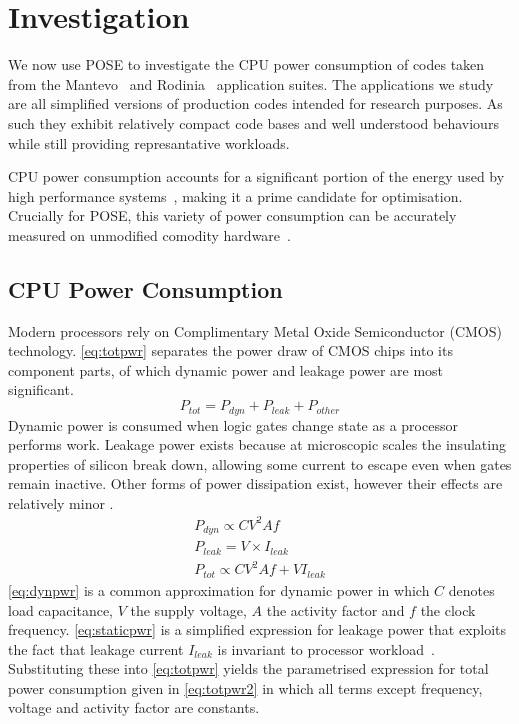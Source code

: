 \section{Investigation}
\label{sec:investigation}
We now use POSE to investigate the CPU power consumption of codes taken from the Mantevo~\cite{heroux:2009aa} and Rodinia~\cite{che:2009aa} application suites.
The applications we study are all simplified versions of production codes intended for research purposes.
As such they exhibit relatively compact code bases and well understood behaviours while still providing represantative workloads.

CPU power consumption accounts for a significant portion of the energy used by high performance systems~\cite{rong:2010aa}, making it a prime candidate for optimisation.
Crucially for POSE, this variety of power consumption can be accurately measured on unmodified comodity hardware~\cite{hackenberg:2013aa}.

\subsection{CPU Power Consumption}
\label{ssec:cpupower}
Modern processors rely on Complimentary Metal Oxide Semiconductor (CMOS) technology.
\autoref{eq:totpwr} separates the power draw of CMOS chips into its component parts, of which dynamic power and leakage power are most significant.
\begin{equation}
\label{eq:totpwr}
P_{tot} = P_{dyn} + P_{leak} + P_{other}
\end{equation}
Dynamic power is consumed when logic gates change state as a processor performs work. 
Leakage power exists because at microscopic scales the insulating properties of silicon break down, allowing some current to escape even when gates remain inactive.
Other forms of power dissipation exist, however their effects are relatively minor \cite{kaxiras:2008aa}.
\begin{gather}
P_{dyn} \propto CV^{2}Af \label{eq:dynpwr} \\
P_{leak} = V \times I_{leak} \label{eq:staticpwr} \\
P_{tot} \propto CV^{2}Af + VI_{leak} \label{eq:totpwr2} 
\end{gather}
\autoref{eq:dynpwr} is a common approximation for dynamic power in which $C$ denotes load capacitance, $V$ the supply voltage, $A$ the activity factor and $f$ the clock frequency. 
\autoref{eq:staticpwr} is a simplified expression for leakage power that exploits the fact that leakage current $I_{leak}$ is invariant to processor workload~\cite{kim:2003aa}.
Substituting these into \autoref{eq:totpwr} yields the parametrised expression for total power consumption given in \autoref{eq:totpwr2} in which all terms except frequency, voltage and activity factor are constants.


